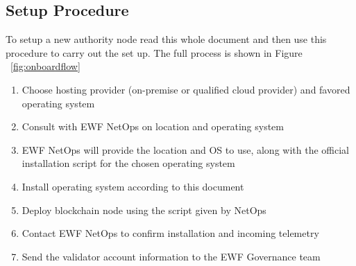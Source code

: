 
\subsection{Setup Procedure}

To setup a new authority node read this whole document and then use this procedure to carry out the set up. The full process is shown in Figure ~\ref{fig:onboardflow}

\begin{enumerate}
    \item Choose hosting provider (on-premise or qualified cloud provider) and favored operating system
    \item Consult with EWF NetOps on location and operating system
    \item EWF NetOps will provide the location and OS to use, along with the official installation script for the chosen operating system
    \item Install operating system according to this document
    \item Deploy blockchain node using the script given by NetOps 
    \item Contact EWF NetOps to confirm installation and incoming telemetry
    \item Send the validator account information to the EWF Governance team
\end{enumerate}


